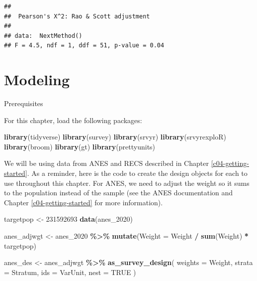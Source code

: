 \documentclass[
]{krantz}
\makeatletter
\newenvironment{Shaded}{\begin{snugshade}}{\end{snugshade}}
\newcommand{\AttributeTok}[1]{\textcolor[rgb]{0.27,0.27,0.27}{#1}}
\newcommand{\ConstantTok}[1]{\textcolor[rgb]{0.37,0.37,0.37}{#1}}
\newcommand{\DecValTok}[1]{\textcolor[rgb]{0.06,0.06,0.06}{#1}}
\newcommand{\FunctionTok}[1]{\textcolor[rgb]{0.27,0.27,0.27}{\textbf{#1}}}
\newcommand{\NormalTok}[1]{#1}
\newcommand{\OtherTok}[1]{\textcolor[rgb]{0.37,0.37,0.37}{#1}}
\newcommand{\SpecialCharTok}[1]{\textcolor[rgb]{0.43,0.43,0.43}{\textbf{#1}}}
\newenvironment{kframe}{%
\medskip{}
\setlength{\fboxsep}{.8em}
 \def\at@end@of@kframe{}%
 \ifinner\ifhmode%
  \def\at@end@of@kframe{\end{minipage}}%
  \begin{minipage}{\columnwidth}%
 \fi\fi%
 \def\FrameCommand##1{\hskip\@totalleftmargin \hskip-\fboxsep
 \colorbox{shadecolor}{##1}\hskip-\fboxsep
     \hskip-\linewidth \hskip-\@totalleftmargin \hskip\columnwidth}%
 \MakeFramed {\advance\hsize-\width
   \@totalleftmargin\z@ \linewidth\hsize
   \@setminipage}}%
 {\par\unskip\endMakeFramed%
 \at@end@of@kframe}
\renewenvironment{Shaded}{\begin{kframe}}{\end{kframe}}
\makeatother
\begin{document}
\begin{verbatim}
## 
##  Pearson's X^2: Rao & Scott adjustment
## 
## data:  NextMethod()
## F = 4.5, ndf = 1, ddf = 51, p-value = 0.04
\end{verbatim}

\hypertarget{c07-modeling}{%
\chapter{Modeling}\label{c07-modeling}}

\begin{prereqbox}{Prerequisites}

For this chapter, load the following packages:

\begin{Shaded}
\begin{Highlighting}[]
\FunctionTok{library}\NormalTok{(tidyverse)}
\FunctionTok{library}\NormalTok{(survey)}
\FunctionTok{library}\NormalTok{(srvyr)}
\FunctionTok{library}\NormalTok{(srvyrexploR)}
\FunctionTok{library}\NormalTok{(broom)}
\FunctionTok{library}\NormalTok{(gt)}
\FunctionTok{library}\NormalTok{(prettyunits)}
\end{Highlighting}
\end{Shaded}

We will be using data from ANES and RECS described in Chapter \ref{c04-getting-started}. As a reminder, here is the code to create the design objects for each to use throughout this chapter. For ANES, we need to adjust the weight so it sums to the population instead of the sample (see the ANES documentation and Chapter \ref{c04-getting-started} for more information).

\begin{Shaded}
\begin{Highlighting}[]
\NormalTok{targetpop }\OtherTok{\textless{}{-}} \DecValTok{231592693}
\FunctionTok{data}\NormalTok{(anes\_2020)}

\NormalTok{anes\_adjwgt }\OtherTok{\textless{}{-}}\NormalTok{ anes\_2020 }\SpecialCharTok{\%\textgreater{}\%}
  \FunctionTok{mutate}\NormalTok{(}\AttributeTok{Weight =}\NormalTok{ Weight }\SpecialCharTok{/} \FunctionTok{sum}\NormalTok{(Weight) }\SpecialCharTok{*}\NormalTok{ targetpop)}

\NormalTok{anes\_des }\OtherTok{\textless{}{-}}\NormalTok{ anes\_adjwgt }\SpecialCharTok{\%\textgreater{}\%}
  \FunctionTok{as\_survey\_design}\NormalTok{(}
    \AttributeTok{weights =}\NormalTok{ Weight,}
    \AttributeTok{strata =}\NormalTok{ Stratum,}
    \AttributeTok{ids =}\NormalTok{ VarUnit,}
    \AttributeTok{nest =} \ConstantTok{TRUE}
\NormalTok{  )}
\end{Highlighting}
\end{Shaded}


\end{prereqbox}
\end{document}
